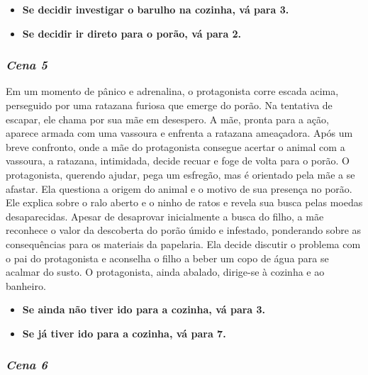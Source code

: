 \begin{itemize}
	\item \textbf{Se decidir investigar o barulho na cozinha, vá para 3.}
	\item \textbf{Se decidir ir direto para o porão, vá para 2.}
\end{itemize}


\bigskip\medskip

\subsubsection*{\textit{\textbf{Cena 5}}}

Em um momento de pânico e adrenalina, o protagonista corre escada acima, perseguido por uma ratazana furiosa que emerge do porão. Na tentativa de escapar, ele chama por sua mãe em desespero. A mãe, pronta para a ação, aparece armada com uma vassoura e enfrenta a ratazana ameaçadora. Após um breve confronto, onde a mãe do protagonista consegue acertar o animal com a vassoura, a ratazana, intimidada, decide recuar e foge de volta para o porão. O protagonista, querendo ajudar, pega um esfregão, mas é orientado pela mãe a se afastar. Ela questiona a origem do animal e o motivo de sua presença no porão. Ele explica sobre o ralo aberto e o ninho de ratos e revela sua busca pelas moedas desaparecidas. Apesar de desaprovar inicialmente a busca do filho, a mãe reconhece o valor da descoberta do porão úmido e infestado, ponderando sobre as consequências para os materiais da papelaria. Ela decide discutir o problema com o pai do protagonista e aconselha o filho a beber um copo de água para se acalmar do susto. O protagonista, ainda abalado, dirige-se à cozinha e ao banheiro.

\begin{itemize}
	\item \textbf{Se ainda não tiver ido para a cozinha, vá para 3.}
	\item \textbf{Se já tiver ido para a cozinha, vá para 7.}
\end{itemize}


\bigskip\medskip

\subsubsection*{\textit{\textbf{Cena 6}}}

